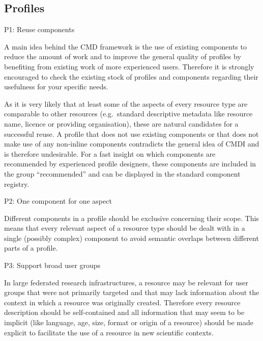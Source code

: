 \subsection{Profiles}\label{profiles}

P1: Reuse components

 

A main idea behind the CMD framework is the use of existing components to reduce the amount of work and to improve the general quality of profiles by benefiting from existing work of more experienced users. Therefore it is strongly encouraged to check the existing stock of profiles and components regarding their usefulness for your specific needs.

\begin{workinprogress}
As it is very likely that at least some of the aspects of every resource type are comparable to other resources (e.g.~standard descriptive metadata like resource name, licence or providing organisation), these are natural candidates for a successful reuse. A profile that does not use existing components or that does not make use of any non-inline components contradicts the general idea of CMDI and is therefore undesirable. For a fast insight on which components are recommended by experienced profile designers, these components are included in the
group ``recommended'' and can be displayed in the standard component registry. 
\end{workinprogress}


P2: One component for one aspect


Different components in a profile should be exclusive concerning their scope. This means that every relevant aspect of a resource type should be dealt with in a single (possibly complex) component to avoid semantic overlaps between different parts of a profile.

P3: Support broad user groups


In large federated research infrastructures, a resource may be relevant for user groups that were not primarily targeted and that may lack information about the context in which a resource was originally created. Therefore every resource description should be self-contained and all information that may seem to be implicit (like language, age, size, format or origin of a resource) should be made explicit to facilitate the use of a resource in new scientific contexts.

